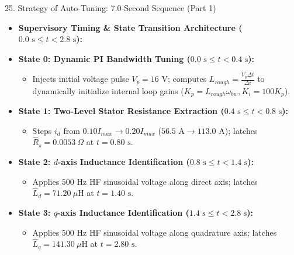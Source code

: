 \documentclass[aspectratio=169]{beamer}
\begin{document}
\begin{frame}{25. Strategy of Auto-Tuning: 7.0-Second Sequence (Part 1)}
    \begin{itemize}
        \item \textbf{Supervisory Timing \& State Transition Architecture ($0.0\text{ s} \le t < 2.8\text{ s}$):}
        \item \textbf{State 0: Dynamic PI Bandwidth Tuning ($0.0\text{ s} \le t < 0.4\text{ s}$):}
        \begin{itemize}
            \item Injects initial voltage pulse $V_p = 16\text{ V}$; computes $L_{rough} = \frac{V_p \Delta t}{\Delta i}$ to dynamically initialize internal loop gains ($K_p = L_{rough}\omega_{bw}, K_i = 100 K_p$).
        \end{itemize}
        \item \textbf{State 1: Two-Level Stator Resistance Extraction ($0.4\text{ s} \le t < 0.8\text{ s}$):}
        \begin{itemize}
            \item Steps $i_d$ from $0.10 I_{max} \rightarrow 0.20 I_{max}$ ($56.5\text{ A} \rightarrow 113.0\text{ A}$); latches $\hat{R}_s = 0.0053\ \Omega$ at $t = 0.80\text{ s}$.
        \end{itemize}
        \item \textbf{State 2: $d$-axis Inductance Identification ($0.8\text{ s} \le t < 1.4\text{ s}$):}
        \begin{itemize}
            \item Applies $500\text{ Hz}$ HF sinusoidal voltage along direct axis; latches $\hat{L}_d = 71.20\ \mu\text{H}$ at $t = 1.40\text{ s}$.
        \end{itemize}
        \item \textbf{State 3: $q$-axis Inductance Identification ($1.4\text{ s} \le t < 2.8\text{ s}$):}
        \begin{itemize}
            \item Applies $500\text{ Hz}$ HF sinusoidal voltage along quadrature axis; latches $\hat{L}_q = 141.30\ \mu\text{H}$ at $t = 2.80\text{ s}$.
        \end{itemize}
    \end{itemize}
\end{frame}
\end{document}
